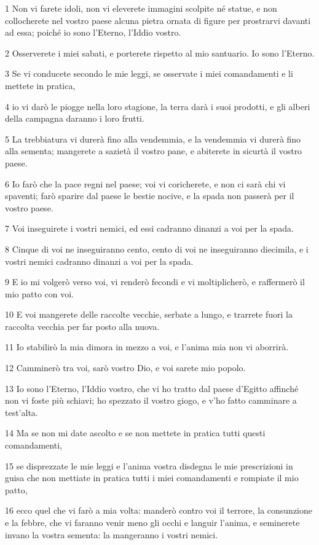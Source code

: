 \par 1 Non vi farete idoli, non vi eleverete immagini scolpite né statue, e non collocherete nel vostro paese alcuna pietra ornata di figure per prostrarvi davanti ad essa; poiché io sono l'Eterno, l'Iddio vostro.
\par 2 Osserverete i miei sabati, e porterete rispetto al mio santuario. Io sono l'Eterno.
\par 3 Se vi conducete secondo le mie leggi, se osservate i miei comandamenti e li mettete in pratica,
\par 4 io vi darò le piogge nella loro stagione, la terra darà i suoi prodotti, e gli alberi della campagna daranno i loro frutti.
\par 5 La trebbiatura vi durerà fino alla vendemmia, e la vendemmia vi durerà fino alla sementa; mangerete a sazietà il vostro pane, e abiterete in sicurtà il vostro paese.
\par 6 Io farò che la pace regni nel paese; voi vi coricherete, e non ci sarà chi vi spaventi; farò sparire dal paese le bestie nocive, e la spada non passerà per il vostro paese.
\par 7 Voi inseguirete i vostri nemici, ed essi cadranno dinanzi a voi per la spada.
\par 8 Cinque di voi ne inseguiranno cento, cento di voi ne inseguiranno diecimila, e i vostri nemici cadranno dinanzi a voi per la spada.
\par 9 E io mi volgerò verso voi, vi renderò fecondi e vi moltiplicherò, e raffermerò il mio patto con voi.
\par 10 E voi mangerete delle raccolte vecchie, serbate a lungo, e trarrete fuori la raccolta vecchia per far posto alla nuova.
\par 11 Io stabilirò la mia dimora in mezzo a voi, e l'anima mia non vi aborrirà.
\par 12 Camminerò tra voi, sarò vostro Dio, e voi sarete mio popolo.
\par 13 Io sono l'Eterno, l'Iddio vostro, che vi ho tratto dal paese d'Egitto affinché non vi foste più schiavi; ho spezzato il vostro giogo, e v'ho fatto camminare a test'alta.
\par 14 Ma se non mi date ascolto e se non mettete in pratica tutti questi comandamenti,
\par 15 se disprezzate le mie leggi e l'anima vostra disdegna le mie prescrizioni in guisa che non mettiate in pratica tutti i miei comandamenti e rompiate il mio patto,
\par 16 ecco quel che vi farò a mia volta: manderò contro voi il terrore, la consunzione e la febbre, che vi faranno venir meno gli occhi e languir l'anima, e seminerete invano la vostra sementa: la mangeranno i vostri nemici.
